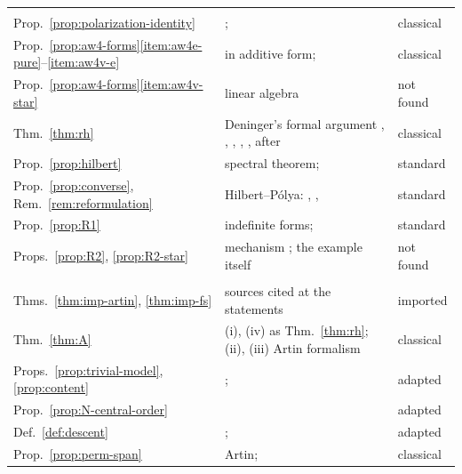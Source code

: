\documentclass[11pt]{amsart}
\theoremstyle{plain}
\theoremstyle{definition}
\theoremstyle{remark}
\numberwithin{equation}{section}
\begin{document}
{\begin{longtable}{@{}>{\raggedright\arraybackslash}p{}
>{\raggedright\arraybackslash}p{}
>{\raggedright\arraybackslash}p{}@{}}
\multicolumn{3}{@{}l}{\emph{Section~\ref{sec:purity}}}\\
Prop.~\ref{prop:polarization-identity} &
\cite[p.~5]{Deninger2010HilbertPolya};
\cite[(7.12)--(7.13)]{Deninger1994Motivic} & classical\\
Prop.~\ref{prop:aw4-forms}\ref{item:aw4e-pure}--\ref{item:aw4v-e} &
\cite[Lemma~4.6]{Kleiman1968Cycles} in additive form;
\cite[(7.13)]{Deninger1994Motivic} & classical\\
Prop.~\ref{prop:aw4-forms}\ref{item:aw4v-star} & linear algebra &
not found\\
Thm.~\ref{thm:rh} & Deninger's formal argument
\cite[(7.11)--(7.13)]{Deninger1994Motivic},
\cite[pp.~168--169]{Deninger1998Analogies},
\cite[pp.~4--5]{Deninger2010HilbertPolya},
\cite[2.7]{Deninger2022NoWeil},
\cite[Conjecture~2.3(iv)--(v)]{FlachMorin2020DeningerWeilArakelov},
after \cite{Serre1960Analogues} & classical\\
Prop.~\ref{prop:hilbert} & spectral theorem;
\cite[p.~33]{Deninger1994Motivic} & standard\\
Prop.~\ref{prop:converse}, Rem.~\ref{rem:reformulation} &
Hilbert--P\'olya: \cite[p.~3]{Connes1998TraceFormula},
\cite[p.~147]{Deninger1992Local}, \cite[p.~5]{Sarnak2004Clay} &
standard\\
Prop.~\ref{prop:R1} & indefinite forms;
\cite[pp.~7--9]{Deninger2010HilbertPolya} & standard\\
Props.~\ref{prop:R2}, \ref{prop:R2-star} & mechanism
\cite[2.7]{Deninger2022NoWeil}; the example itself & not found\\
\multicolumn{3}{@{}l}{\emph{Section~\ref{sec:class}}}\\
Thms.~\ref{thm:imp-artin}, \ref{thm:imp-fs} & sources cited at the
statements & imported\\
Thm.~\ref{thm:A} & (i), (iv) as Thm.~\ref{thm:rh}; (ii), (iii) Artin
formalism & classical\\
Props.~\ref{prop:trivial-model}, \ref{prop:content} &
\cite[2.6--2.9, pp.~3--4]{Deninger2022NoWeil};
\cite[Proposition~3.1]{Deninger2025BSDDedekind} & adapted\\
Prop.~\ref{prop:N-central-order} & \cite[2.9 and
Theorem~2.13]{Deninger2022NoWeil} & adapted\\
Def.~\ref{def:descent} & \cite[p.~4]{Deninger2022NoWeil};
\cite[\S\S2.8--2.10]{Deninger2025BSDDedekind} & adapted\\
Prop.~\ref{prop:perm-span} & Artin;
\cite[\S13.1, Theorems~29--30]{Serre1977LinearReps} & classical\\

\end{longtable}}
\end{document}
